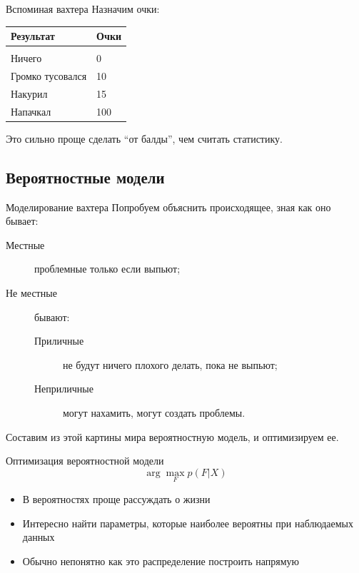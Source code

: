 \documentclass[14pt, fleqn, xcolor={dvipsnames, table}]{beamer}
\begin{document}
\begin{frame}{Вспоминая вахтера}
Назначим очки:

\begin{tabular}{p{}|l}
Результат & Очки \\
\hline \\
Ничего & 0 \\
Громко тусовался & 10 \\
Накурил & 15 \\
Напачкал & 100 \\
\end{tabular}

Это сильно проще сделать ``от балды'', чем считать статистику.
\end{frame}

\subsection{Вероятностные модели}

\begin{frame}{Моделирование вахтера}
Попробуем объяснить происходящее, зная как оно бывает:
\begin{description}
  \item[Местные] проблемные только если выпьют;
  \item[Не местные] бывают:
  \begin{description}
    \item[Приличные] не будут ничего плохого делать, пока не выпьют;
    \item[Неприличные] могут нахамить, могут создать проблемы.
  \end{description}
\end{description}
Составим из этой картины мира вероятностную модель, и оптимизируем ее.
\end{frame}

\begin{frame}{Оптимизация вероятностной модели}
$$
\arg \max_F p(F|X)
$$
\begin{itemize}
  \item В вероятностях проще рассуждать о жизни
  \item Интересно найти параметры, которые наиболее вероятны при наблюдаемых данных
  \item Обычно непонятно как это распределение построить напрямую
\end{itemize}
\end{frame}
\end{document}
